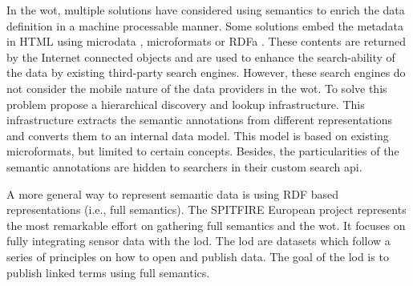 In the \acl{wot}, multiple solutions have considered using semantics to enrich the data definition in a machine processable manner.
Some solutions embed the metadata in HTML using microdata , microformats  or RDFa .
These contents are returned by the Internet connected objects and are used to enhance the search-ability of the data by existing third-party search engines.
However, these search engines do not consider the mobile nature of the data providers in the \ac{wot}. %
To solve this problem \citet{trifa_leveraging_2011} propose a hierarchical discovery and lookup infrastructure.
This infrastructure extracts the semantic annotations from different representations and converts them to an internal data model.
This model is based on existing microformats, but limited to certain concepts.
Besides, the particularities of the semantic annotations are hidden to searchers in their custom search \acs{api}. %


A more general way to represent semantic data is using RDF  based representations (i.e., full semantics). %
The SPITFIRE European project  represents the most remarkable effort on gathering full semantics and the \ac{wot}.
It focuses on fully integrating sensor data with the \ac{lod}. 
The \ac{lod} are datasets which follow a series of principles on how to open and publish data.
The goal of the \ac{lod} is to publish linked terms using full semantics.

